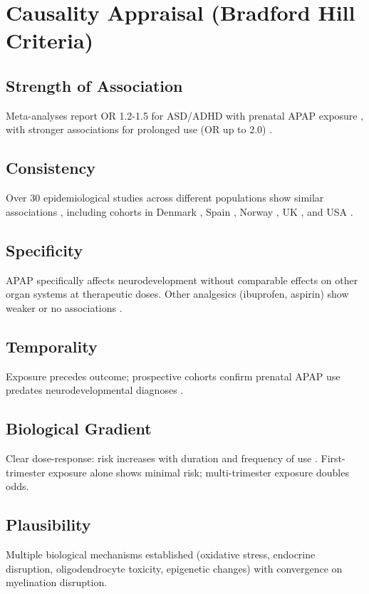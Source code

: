 \documentclass[12pt]{article}
\begin{document}
\section{Causality Appraisal (Bradford Hill Criteria)}

\subsection{Strength of Association}
Meta-analyses report OR 1.2-1.5 for ASD/ADHD with prenatal APAP exposure \citep{masarwa2018}, with stronger associations for prolonged use (OR up to 2.0) \citep{chen2023,liew2014}.

\subsection{Consistency}
Over 30 epidemiological studies across different populations show similar associations \citep{navarro2025}, including cohorts in Denmark \citep{liew2016}, Spain \citep{avella2016}, Norway \citep{brandlistuen2013}, UK \citep{stergiakouli2016}, and USA \citep{ji2020}.

\subsection{Specificity}
APAP specifically affects neurodevelopment without comparable effects on other organ systems at therapeutic doses. Other analgesics (ibuprofen, aspirin) show weaker or no associations \citep{masarwa2018}.

\subsection{Temporality}
Exposure precedes outcome; prospective cohorts confirm prenatal APAP use predates neurodevelopmental diagnoses \citep{liew2016}.

\subsection{Biological Gradient}
Clear dose-response: risk increases with duration and frequency of use \citep{liew2014,chen2023}. First-trimester exposure alone shows minimal risk; multi-trimester exposure doubles odds.

\subsection{Plausibility}
Multiple biological mechanisms established (oxidative stress, endocrine disruption, oligodendrocyte toxicity, epigenetic changes) with convergence on myelination disruption.
\end{document}
